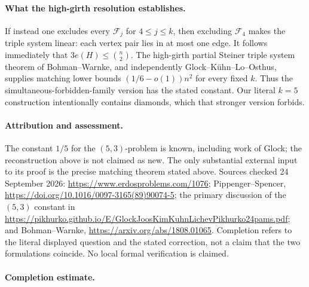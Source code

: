 \paragraph{What the high-girth resolution establishes.}
If instead one excludes every \(\mathcal F_j\) for \(4\leq j\leq k\), then excluding \(\mathcal F_4\) makes the triple system linear: each vertex pair lies in at most one edge. It follows immediately that \(3e(H)\leq\binom n2\). The high-girth partial Steiner triple system theorem of Bohman--Warnke, and independently Glock--K\"uhn--Lo--Osthus, supplies matching lower bounds \((1/6-o(1))n^2\) for every fixed \(k\). Thus the simultaneous-forbidden-family version has the stated constant. Our literal \(k=5\) construction intentionally contains diamonds, which that stronger version forbids.

\paragraph{Attribution and assessment.}
The constant \(1/5\) for the \((5,3)\)-problem is known, including work of Glock; the reconstruction above is not claimed as new. The only substantial external input to its proof is the precise matching theorem stated above. Sources checked 24 September 2026: \url{https://www.erdosproblems.com/1076}; Pippenger--Spencer, \url{https://doi.org/10.1016/0097-3165(89)90074-5}; the primary discussion of the \((5,3)\) constant in \url{https://pikhurko.github.io/E/GlockJoosKimKuhnLichevPikhurko24pams.pdf}; and Bohman--Warnke, \url{https://arxiv.org/abs/1808.01065}. Completion refers to the literal displayed question and the stated correction, not a claim that the two formulations coincide. No local formal verification is claimed.

\paragraph{Completion estimate.}
